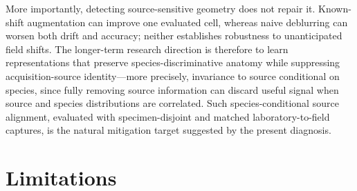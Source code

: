\documentclass[a4paper,fleqn]{els-cas-templates/cas-sc}
\begin{document}
More importantly, detecting source-sensitive geometry does not repair it.
Known-shift augmentation can improve one evaluated cell, whereas naive
deblurring can worsen both drift and accuracy; neither establishes robustness to
unanticipated field shifts. The longer-term research direction is therefore to
learn representations that preserve species-discriminative anatomy while
suppressing acquisition-source identity---more precisely, invariance to source
conditional on species, since fully removing source information can discard
useful signal when source and species distributions are correlated. Such
species-conditional source alignment, evaluated with specimen-disjoint and
matched laboratory-to-field captures, is the natural mitigation target suggested
by the present diagnosis.

\section{Limitations}
\end{document}
